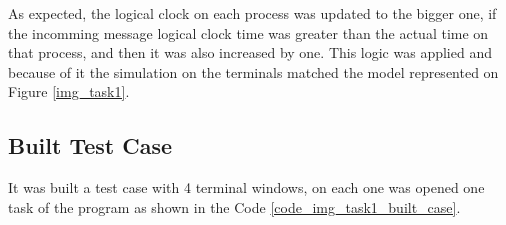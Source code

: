 \documentclass[a4paper, 11pt]{article}
\begin{document}
%
% 
%
%
%

As expected, the logical clock on each process was updated to the bigger one, if the incomming message logical clock time was greater than the actual time on that process, and then it was also increased by one. This logic was applied and because of it the simulation on the terminals matched the model represented on Figure \ref{img_task1}.

\subsection*{Built Test Case}

It was built a test case with 4 terminal windows, on each one was opened one task of the program as shown in the Code \ref{code_img_task1_built_case}.
\end{document}
